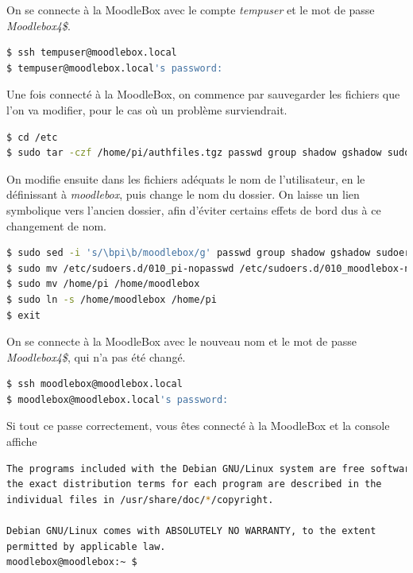 \documentclass[11pt]{article}
\begin{document}
On se connecte à la MoodleBox avec le compte \emph{tempuser} et le mot de passe \emph{Moodlebox4\$}.

\begin{lstlisting}[language=bash]
$ ssh tempuser@moodlebox.local
$ tempuser@moodlebox.local's password:
\end{lstlisting}

Une fois connecté à la MoodleBox, on commence par sauvegarder les fichiers que l'on va modifier, pour le cas où un problème surviendrait.

\begin{lstlisting}[language=bash]
$ cd /etc
$ sudo tar -czf /home/pi/authfiles.tgz passwd group shadow gshadow sudoers sudoers.d/010_pi-nopasswd systemd/system/autologin@.service
\end{lstlisting}

On modifie ensuite dans les fichiers adéquats le nom de l'utilisateur, en le définissant à \emph{moodlebox}, puis change le nom du dossier. On laisse un lien symbolique vers l'ancien dossier, afin d'éviter certains effets de bord dus à ce changement de nom.
\begin{lstlisting}[language=bash]
$ sudo sed -i 's/\bpi\b/moodlebox/g' passwd group shadow gshadow sudoers sudoers.d/010_pi-nopasswd systemd/system/autologin@.service
$ sudo mv /etc/sudoers.d/010_pi-nopasswd /etc/sudoers.d/010_moodlebox-nopasswd
$ sudo mv /home/pi /home/moodlebox
$ sudo ln -s /home/moodlebox /home/pi
$ exit
\end{lstlisting}

On se connecte à la MoodleBox avec le nouveau nom et le mot de passe \emph{Moodlebox4\$}, qui n'a pas été changé.

\begin{lstlisting}[language=bash]
$ ssh moodlebox@moodlebox.local
$ moodlebox@moodlebox.local's password:
\end{lstlisting}

\begin{verification}
Si tout ce passe correctement, vous êtes connecté à la MoodleBox et la console affiche
\begin{lstlisting}[language=bash]
The programs included with the Debian GNU/Linux system are free software;
the exact distribution terms for each program are described in the
individual files in /usr/share/doc/*/copyright.

Debian GNU/Linux comes with ABSOLUTELY NO WARRANTY, to the extent
permitted by applicable law.
moodlebox@moodlebox:~ $
\end{lstlisting}
\end{verification}
\end{document}
